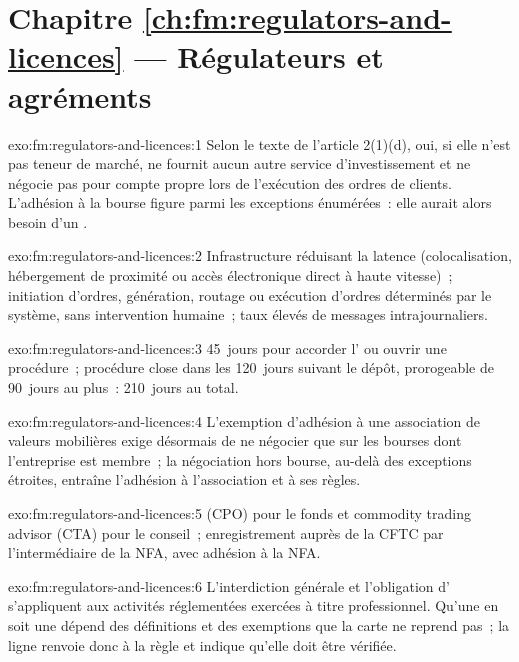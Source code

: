 \section*{Chapitre \ref{ch:fm:regulators-and-licences} --- Régulateurs et agréments}

\begin{solution}{exo:fm:regulators-and-licences:1}
Selon le texte de l'article 2(1)(d), oui, si elle n'est pas teneur de marché, ne fournit aucun autre service d'investissement et ne négocie pas pour compte propre
lors de l'exécution des ordres de clients. L'adhésion à la bourse figure parmi les exceptions énumérées~: elle aurait alors besoin d'un .
\end{solution}

\begin{solution}{exo:fm:regulators-and-licences:2}
Infrastructure réduisant la latence (colocalisation, hébergement de proximité ou accès électronique direct à haute vitesse)~; initiation d'ordres,
génération, routage ou exécution d'ordres déterminés par le système, sans intervention humaine~; taux élevés de messages intrajournaliers.
\end{solution}

\begin{solution}{exo:fm:regulators-and-licences:3}
45~jours pour accorder l' ou ouvrir une procédure~; procédure close dans les 120~jours suivant le dépôt, prorogeable de 90~jours au plus~: 210~jours au total.
\end{solution}

\begin{solution}{exo:fm:regulators-and-licences:4}
L'exemption d'adhésion à une association de valeurs mobilières exige désormais de ne négocier que sur les bourses dont l'entreprise est membre~; la négociation
hors bourse, au-delà des exceptions étroites, entraîne l'adhésion à l'association et à ses règles.
\end{solution}

\begin{solution}{exo:fm:regulators-and-licences:5}
 (CPO) pour le fonds et commodity trading advisor (CTA) pour le conseil~; enregistrement auprès de la CFTC par l'intermédiaire de la NFA, avec
adhésion à la NFA.
\end{solution}

\begin{solution}{exo:fm:regulators-and-licences:6}
L'interdiction générale et l'obligation d' s'appliquent aux activités réglementées exercées à titre professionnel. Qu'une  en soit une
dépend des définitions et des exemptions que la carte ne reprend pas~; la ligne renvoie donc à la règle et indique qu'elle doit être vérifiée.
\end{solution}

